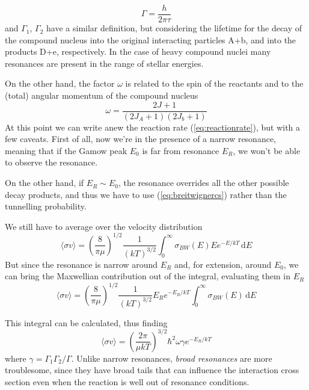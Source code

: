 \begin{equation}
    \Gamma = \frac{h}{2\pi\tau}
    \label{eq:branchingfraction}
\end{equation}
and $\Gamma_{1}$, $\Gamma_{2}$ have a similar definition, but considering the lifetime for the decay of the compound nucleus into the original interacting particles A+b, and into the products D+e, respectively. In the case of heavy compound nuclei many resonances are present in the range of stellar energies.
\par On the other hand, the factor $\omega$ is related to the spin of the reactants and to the (total) angular momentum of the compound nucleus
\begin{equation*}
    \omega = \frac{2J+1}{(2J_{A}+1)(2J_{b}+1)}
\end{equation*}
At this point we can write anew the reaction rate (\ref{eq:reactionrate}), but with a few caveats. First of all, now we're in the presence of a narrow resonance, meaning that if the Gamow peak $E_{0}$ is far from resonance $E_{R}$, we won't be able to observe the resonance.
\par On the other hand, if $E_{R}\sim E_{0}$, the resonance overrides all the other possible decay products, and thus we have to use (\ref{eq:breitwignercs}) rather than the tunnelling probability.
\par We still have to average over the velocity distribution
\begin{equation}
    \langle \sigma v \rangle = \left(\frac{8}{\pi\mu}\right)^{1/2}\frac{1}{(kT)^{3/2}}\int_{0}^{\infty}\sigma_{BW}(E)Ee^{-E/kT}\,\text{d}E
    \label{eq:resonanrreactionrate}
\end{equation}
But since the resonance is narrow around $E_{R}$ and, for extension, around $E_{0}$, we can bring the Maxwellian contribution out of the integral, evaluating them in $E_{R}$
\begin{equation*}
    \langle \sigma v \rangle = \left(\frac{8}{\pi\mu}\right)^{1/2}\frac{1}{(kT)^{3/2}}E_{R}e^{-E_{R}/kT}\int_{0}^{\infty}\sigma_{BW}(E)\,\text{d}E
\end{equation*}
\par This integral can be calculated, thus finding
\begin{equation}
    \langle \sigma v \rangle = \left(\frac{2\pi}{\mu kT}\right)^{3/2}\hbar^{2}\omega\gamma e^{-E_{R}/kT}
        \label{eq:narrowresonanrreactionrate}
\end{equation}
where $\gamma = \Gamma_{1}\Gamma_{2}/\Gamma$. Unlike narrow resonances, \emph{broad resonances} are more troublesome, since they have broad tails that can influence the interaction cross section even when the reaction is well out of resonance conditions.
